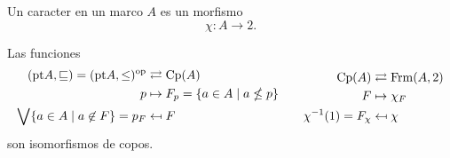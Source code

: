 \begin{definition}
    Un caracter en un marco $A$ es un morfismo
    \[
        \chi:A\to 2
    .\]
\end{definition}

\begin{theorem}
    Las funciones
    \[
        \begin{aligned}
            (\mathrm{pt} A,\sqsubseteq)
            =(\mathrm{pt} A,\leq)^{\mathrm{op}} &\rightleftarrows \mathrm{Cp}(A) \\
            p &\mapsto F_p=\{a\in A\mid a\nleq p\} \\
            \bigvee\{a\in A\mid a\not\in F\} = p_F &\mapsfrom F
        \end{aligned}
        \qquad
        \begin{aligned}
            \mathrm{Cp}(A) &\rightleftarrows \mathrm{Frm}(A,2) \\
            F &\mapsto \chi_F \\
            \chi^{-1}(1) = F_\chi &\mapsfrom \chi
        \end{aligned}
    \]
    son isomorfismos de copos.
\end{theorem}
